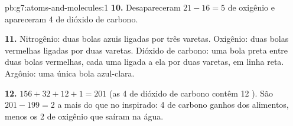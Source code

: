 \begin{solution}{pb:g7:atoms-and-molecules:1}
\textbf{10.} Desapareceram $21 - 16 = 5$  de oxigênio e
apareceram 4  de dióxido de carbono.

\textbf{11.} Nitrogênio: duas bolas azuis ligadas por três varetas.
Oxigênio: duas bolas vermelhas ligadas por duas varetas. Dióxido de
carbono: uma bola preta entre duas bolas vermelhas, cada uma ligada a ela
por duas varetas, em linha reta. Argônio: uma única bola azul-clara.

\textbf{12.} $156 + 32 + 12 + 1 = 201$  (as 4  de dióxido
de carbono contêm 12 ). São $201 - 199 = 2$  a mais do que no
 inspirado: 4  de carbono ganhos dos alimentos, menos os 2 
de oxigênio que saíram na água.
\end{solution}
